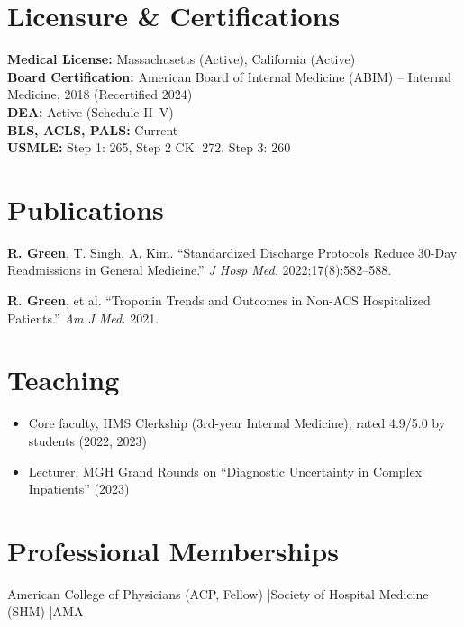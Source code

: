 \documentclass[11pt,a4paper]{article}
\begin{document}
\section{Licensure \& Certifications}
\textbf{Medical License:} Massachusetts (Active), California (Active)\\
\textbf{Board Certification:} American Board of Internal Medicine (ABIM) -- Internal Medicine, 2018 (Recertified 2024)\\
\textbf{DEA:} Active (Schedule II--V)\\
\textbf{BLS, ACLS, PALS:} Current\\
\textbf{USMLE:} Step 1: 265, Step 2 CK: 272, Step 3: 260

\section{Publications}
\begin{enumerate}[leftmargin=*, label={[\arabic*]}]
  \item \textbf{R. Green}, T. Singh, A. Kim. ``Standardized Discharge Protocols Reduce 30-Day Readmissions in General Medicine.'' \textit{J Hosp Med.} 2022;17(8):582--588.
  \item \textbf{R. Green}, et al. ``Troponin Trends and Outcomes in Non-ACS Hospitalized Patients.'' \textit{Am J Med.} 2021.
\end{enumerate}

\section{Teaching}
\begin{itemize}
  \item Core faculty, HMS Clerkship (3rd-year Internal Medicine); rated 4.9/5.0 by students (2022, 2023)
  \item Lecturer: MGH Grand Rounds on ``Diagnostic Uncertainty in Complex Inpatients'' (2023)
\end{itemize}

\section{Professional Memberships}
American College of Physicians (ACP, Fellow) \quad|\quad Society of Hospital Medicine (SHM) \quad|\quad AMA
\end{document}
